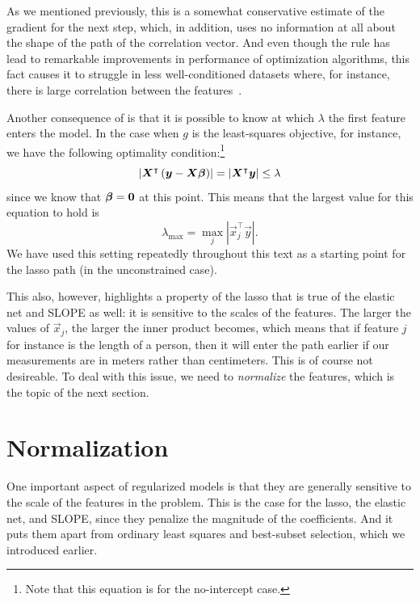 As we mentioned previously, this is a somewhat conservative estimate of the gradient for the next step, which, in addition, uses no information at all about the shape of the path of the correlation vector. And even though the rule has lead to remarkable improvements in performance of optimization algorithms, this fact causes it to struggle in less well-conditioned datasets where, for instance, there is large correlation between the features~\parencite{tibshirani2012}.

Another consequence of  is that it is possible to know at which \(\lambda\) the first feature enters the model. In the case when \(g\) is the least-squares objective, for instance, we have the following optimality condition:\footnote{Note that this equation is for the no-intercept case.}
\[
  \left|\boldsymbol{X}^\intercal\left(\boldsymbol{y} - \boldsymbol{X}\boldsymbol{\beta}\right)\right| = |\boldsymbol{X}^\intercal \boldsymbol{y}| \leq \lambda
\]
since we know that \(\boldsymbol{\beta} = \boldsymbol{0}\) at this point. This means that the largest value for this equation to hold is
\[
  \lambda_\text{max} = \max_j |\vec{x}_j^\intercal \vec{y}|.
\]
We have used this setting repeatedly throughout this text as a starting point for the lasso path (in the unconstrained case).

This also, however, highlights a property of the lasso that is true of the elastic net and SLOPE as well: it is sensitive to the scales of the features. The larger the values of \(\vec{x}_j\), the larger the inner product  becomes, which means that if feature \(j\) for instance is the length of a person, then it will enter the path earlier if our measurements are in meters rather than centimeters. This is of course not desireable. To deal with this issue, we need to \emph{normalize} the features, which is the topic of the next section.

\section{Normalization}\label{sec:normalization}

One important aspect of regularized models is that they are generally sensitive to the scale of the features in the problem. This is the case for the lasso, the elastic net, and SLOPE, since they penalize the magnitude of the coefficients. And it puts them apart from ordinary least squares and best-subset selection, which we introduced earlier.

